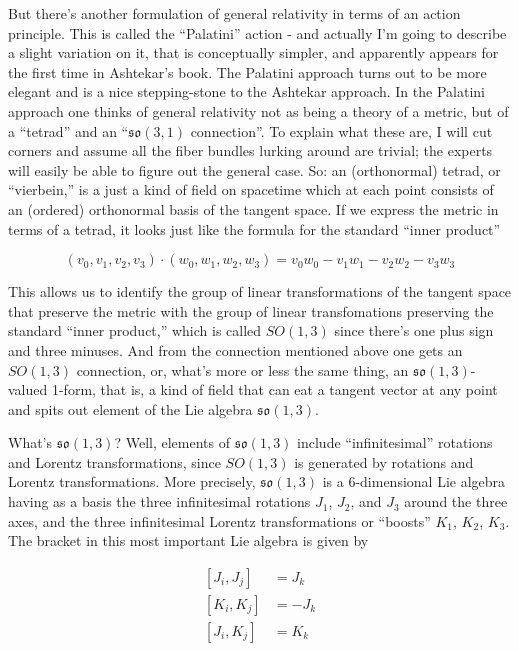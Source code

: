 \documentclass{article}
\begin{document}
But there's another formulation of general relativity in terms of an
action principle. This is called the ``Palatini'' action - and actually
I'm going to describe a slight variation on it, that is conceptually
simpler, and apparently appears for the first time in Ashtekar's book.
The Palatini approach turns out to be more elegant and is a nice
stepping-stone to the Ashtekar approach. In the Palatini approach one
thinks of general relativity not as being a theory of a metric, but of a
``tetrad'' and an ``\(\mathfrak{so}(3,1)\) connection''. To explain what
these are, I will cut corners and assume all the fiber bundles lurking
around are trivial; the experts will easily be able to figure out the
general case. So: an (orthonormal) tetrad, or ``vierbein,'' is a just a
kind of field on spacetime which at each point consists of an (ordered)
orthonormal basis of the tangent space. If we express the metric in
terms of a tetrad, it looks just like the formula for the standard
``inner product''

\[(v_0,v_1,v_2,v_3)\cdot(w_0,w_1,w_2,w_3) = v_0w_0 - v_1w_1 - v_2w_2 - v_3w_3\]

This allows us to identify the group of linear transformations of the
tangent space that preserve the metric with the group of linear
transfomations preserving the standard ``inner product,'' which is
called \(SO(1,3)\) since there's one plus sign and three minuses. And
from the connection mentioned above one gets an \(SO(1,3)\) connection,
or, what's more or less the same thing, an \(\mathfrak{so}(1,3)\)-valued
1-form, that is, a kind of field that can eat a tangent vector at any
point and spits out element of the Lie algebra \(\mathfrak{so}(1,3)\).

What's \(\mathfrak{so}(1,3)\)? Well, elements of \(\mathfrak{so}(1,3)\)
include ``infinitesimal'' rotations and Lorentz transformations, since
\(SO(1,3)\) is generated by rotations and Lorentz transformations. More
precisely, \(\mathfrak{so}(1,3)\) is a 6-dimensional Lie algebra having
as a basis the three infinitesimal rotations \(J_1\), \(J_2\), and
\(J_3\) around the three axes, and the three infinitesimal Lorentz
transformations or ``boosts'' \(K_1\), \(K_2\), \(K_3\). The bracket in
this most important Lie algebra is given by

\[\begin{aligned}[J_i,J_j] & = J_k \\ [K_i,K_j] &= -J_k \\ [J_i,K_j] &= K_k\end{aligned}\]
\end{document}

